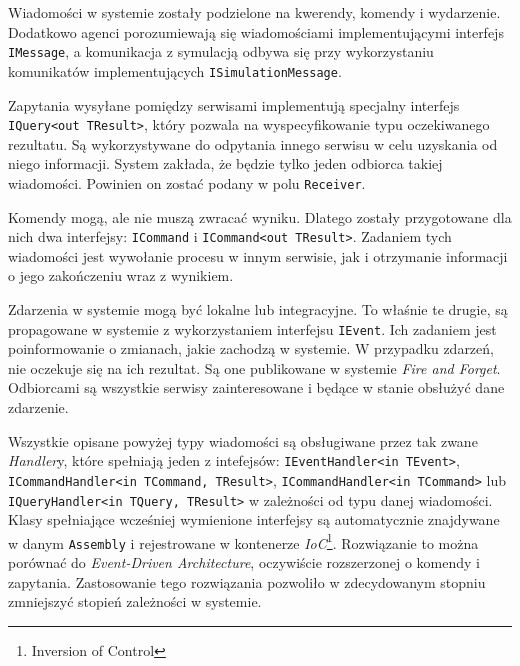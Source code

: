 \par Wiadomości w systemie zostały podzielone na kwerendy, komendy i wydarzenie. Dodatkowo agenci porozumiewają się wiadomościami implementującymi interfejs \texttt{IMessage}, a komunikacja z symulacją odbywa się przy wykorzystaniu komunikatów implementujących \texttt{ISimulationMessage}.

\par Zapytania wysyłane pomiędzy serwisami implementują specjalny interfejs \texttt{IQuery<out TResult>}, który pozwala na wyspecyfikowanie typu oczekiwanego rezultatu. Są wykorzystywane do odpytania innego serwisu w celu uzyskania od niego informacji. System zakłada, że będzie tylko jeden odbiorca takiej wiadomości. Powinien on zostać podany w polu \texttt{Receiver}.

\par Komendy mogą, ale nie muszą zwracać wyniku. Dlatego zostały przygotowane dla nich dwa interfejsy: \texttt{ICommand} i \texttt{ICommand<out TResult>}. Zadaniem tych wiadomości jest wywołanie procesu w innym serwisie, jak i otrzymanie informacji o jego zakończeniu wraz z wynikiem.

\par Zdarzenia w systemie mogą być lokalne lub integracyjne. To właśnie te drugie, są propagowane w systemie z wykorzystaniem interfejsu \texttt{IEvent}. Ich zadaniem jest poinformowanie o zmianach, jakie zachodzą w systemie. W przypadku zdarzeń, nie oczekuje się na ich rezultat. Są one publikowane w systemie \emph{Fire and Forget}. Odbiorcami są wszystkie serwisy zainteresowane i będące w stanie obsłużyć dane zdarzenie.

\par Wszystkie opisane powyżej typy wiadomości są obsługiwane przez tak zwane \emph{Handler}y, które spełniają jeden z intefejsów: \texttt{IEventHandler<in TEvent>}, \texttt{ICommandHandler<in TCommand, TResult>}, \texttt{ICommandHandler<in TCommand>} lub \texttt{IQueryHandler<in TQuery, TResult>} w zależności od typu danej wiadomości. Klasy spełniające wcześniej wymienione interfejsy są automatycznie znajdywane w danym \texttt{Assembly} i rejestrowane w kontenerze \emph{IoC}\footnote{Inversion of Control}. Rozwiązanie to można porównać do \emph{Event-Driven Architecture}, oczywiście rozszerzonej o komendy i zapytania. Zastosowanie tego rozwiązania pozwoliło w zdecydowanym stopniu zmniejszyć stopień zależności w systemie.

